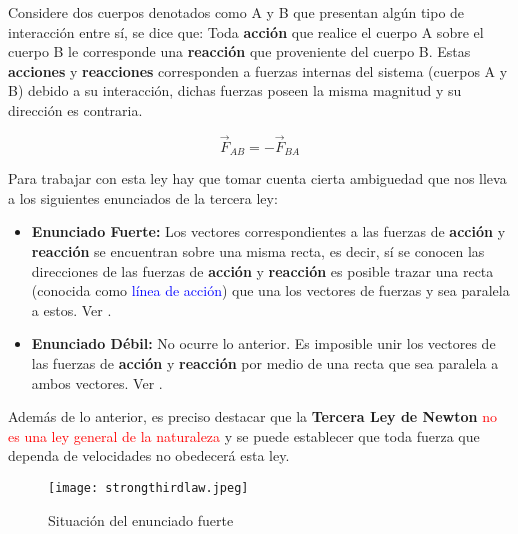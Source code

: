 \documentclass[/home/hernan-barquero/Documents/Apuntes_mecanica_teorica/main.tex]{subfiles}
\begin{document}
	\begin{definition}
		Considere dos cuerpos denotados como A y B que presentan algún tipo de interacción entre sí, se dice que:
		Toda \textbf{acción} que realice el cuerpo A sobre el cuerpo B le corresponde una \textbf{reacción} que proveniente del cuerpo B. Estas \textbf{acciones} y \textbf{reacciones} corresponden a fuerzas internas del sistema (cuerpos A y B) debido a su interacción, dichas fuerzas poseen la misma magnitud y su dirección es contraria.
		
		\begin{equation}
			\vec{F}_{AB} = - \vec{F}_{BA}
			\label{eq: NThirdlaw}
		\end{equation}

		Para trabajar con esta ley hay que tomar cuenta cierta ambiguedad que nos lleva a los siguientes enunciados de la tercera ley:
		\begin{itemize}
			\item \textbf{Enunciado Fuerte: } Los vectores correspondientes a las fuerzas de \textbf{acción} y \textbf{reacción} se encuentran sobre una misma recta, es decir, sí se conocen las direcciones de las fuerzas de \textbf{acción} y \textbf{reacción} es posible trazar una recta (conocida como \textcolor{blue}{línea de acción}) que una los vectores de fuerzas y sea paralela a estos. Ver .
			\item \textbf{Enunciado Débil: } No ocurre lo anterior. Es imposible unir los vectores de las fuerzas de \textbf{acción} y \textbf{reacción} por medio de una recta que sea paralela a ambos vectores. Ver .
		\end{itemize}

		Además de lo anterior, es preciso destacar que la \textbf{Tercera Ley de Newton} \textcolor{red}{no es una ley general de la naturaleza} y se puede establecer que toda fuerza que dependa de velocidades no obedecerá esta ley.
	\end{definition}

	\begin{marginfigure}
		\begin{figure}[H]
			\centering
			\texttt{[image: strongthirdlaw.jpeg]}
			\caption{Situación del enunciado fuerte}
			\label{fig: Nthirdstrong}
		\end{figure}
	\end{marginfigure}
\end{document}
